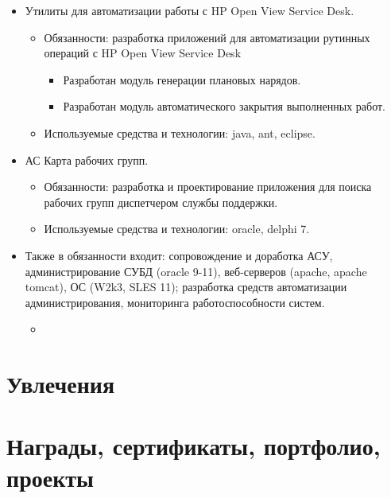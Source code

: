 \documentclass[14pt,a4paper]{moderncv}
\begin{document}
{\begin{itemize}
\begin{itemize}
  \end{itemize}
\item Утилиты для автоматизации работы с HP Open View Service Desk.
  \begin{itemize}%
    \item Обязанности: разработка приложений для автоматизации рутинных операций с HP Open View Service Desk    
      \begin{itemize}%
        \item Разработан модуль генерации плановых нарядов.
        \item Разработан модуль автоматического закрытия выполненных работ.
      \end{itemize}
    \item Используемые средства и технологии: java, ant, eclipse.
  \end{itemize}
\item АС Карта рабочих групп. 
  \begin{itemize}%
    \item Обязанности: разработка и проектирование приложения для поиска рабочих групп диспетчером службы поддержки.          
    \item Используемые средства и технологии: oracle, delphi 7.
  \end{itemize}
\item[] Также в обязанности входит: сопровождение и доработка АСУ, администрирование СУБД (oracle 9-11), веб-серверов (apache, apache tomcat), ОС (W2k3, SLES 11); разработка средств автоматизации администрирования, мониторинга работоспособности систем.
  \begin{itemize}
    \item[]
  \end{itemize}
\end{itemize}}



\section{Увлечения}

\section{Награды, сертификаты, портфолио, проекты}


\end{document}
